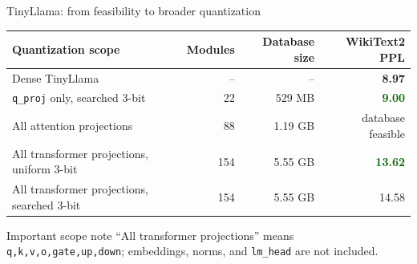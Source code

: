 \documentclass[aspectratio=169]{beamer}
\newcommand{\good}[1]{\textcolor{darkgreen}{\textbf{#1}}}
\begin{document}

\begin{frame}{TinyLlama: from feasibility to broader quantization}
\begin{table}
\centering
\begin{tabular}{lrrr}
\toprule
Quantization scope & Modules & Database size & WikiText2 PPL \\
\midrule
Dense TinyLlama & -- & -- & \textbf{8.97} \\
\texttt{q\_proj} only, searched 3-bit & 22 & 529 MB & \good{9.00} \\
All attention projections & 88 & 1.19 GB & database feasible \\
All transformer projections, uniform 3-bit & 154 & 5.55 GB & \good{13.62} \\
All transformer projections, searched 3-bit & 154 & 5.55 GB & 14.58 \\
\bottomrule
\end{tabular}
\end{table}

\vspace{0.2cm}
\begin{block}{Important scope note}
``All transformer projections'' means \texttt{q,k,v,o,gate,up,down}; embeddings, norms, and \texttt{lm\_head} are not included.
\end{block}
\end{frame}

\end{document}
